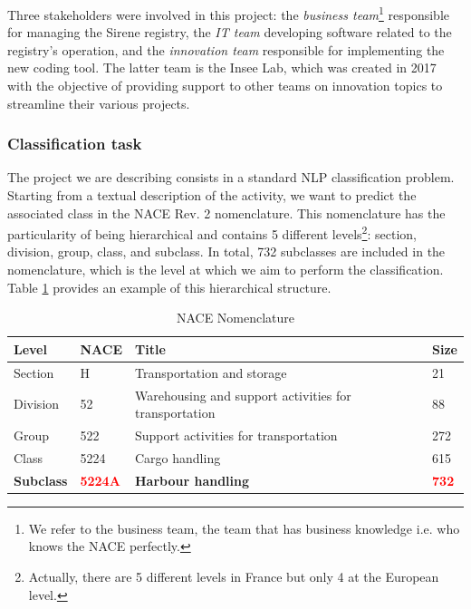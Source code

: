 Three stakeholders were involved in this project: the \textit{business team}\footnote{We refer to the business team, the team that has business knowledge i.e. who knows the NACE perfectly.} responsible for managing the Sirene registry, the \textit{IT team} developing software related to the registry's operation, and the \textit{innovation team} responsible for implementing the new coding tool. The latter team is the Insee Lab, which was created in 2017 with the objective of providing support to other teams on innovation topics to streamline their various projects.

\subsubsection{Classification task}

The project we are describing consists in a standard NLP classification problem. Starting from a textual description of the activity, we want to predict the associated class in the NACE Rev. 2 nomenclature. This nomenclature has the particularity of being hierarchical and contains 5 different levels\footnote{Actually, there are 5 different levels in France but only 4 at the European level.}: section, division, group, class, and subclass. In total, 732 subclasses are included in the nomenclature, which is the level at which we aim to perform the classification. Table \ref{tab:nace-nomenclature} provides an example of this hierarchical structure.

\begin{table}[htbp]
    \centering
    \begin{tabular}{llll}
    \textbf{Level} & \textbf{NACE} & \textbf{Title} & \textbf{Size} \\ \hline
    Section & H & Transportation and storage & 21 \\ \hline
    Division & 52 & Warehousing and support activities for transportation & 88 \\ \hline
    Group & 522 & Support activities for transportation & 272 \\ \hline
    Class & 5224 & Cargo handling & 615 \\ \hline
    \textbf{Subclass} & \textbf{\textcolor{red}{5224A}} & \textbf{Harbour handling} & \textbf{\textcolor{red}{732}} \\ 
    \end{tabular}
    \caption{NACE Nomenclature}
    \label{tab:nace-nomenclature}
    \end{table}


